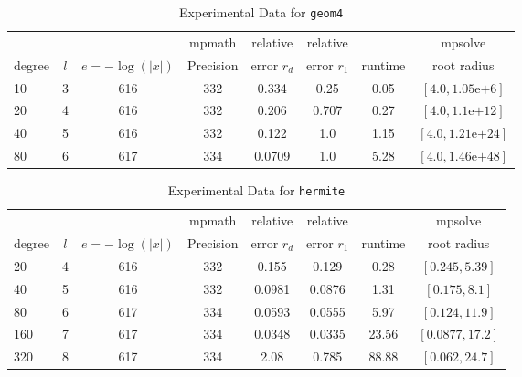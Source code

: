 \documentclass[sigconf]{acmart}
\begin{document}
\begin{table}[t]
\caption{Experimental Data for \texttt{geom4}} %
\label{tab:geom4}
\vskip -0.15in
\begin{center}
\begin{small}
\begin{sc}
\begin{tabular}{lccccccc}
\toprule
&  &  & mpmath & relative  & relative &  & mpsolve \\
degree  & $l$& $e=-\log(|x|)$& Precision &error $r_d$       & error $r_1$ &runtime& root radius\\
\midrule
 10 & 3 & 616 & 332 & 0.334 & 0.25 & 0.05 & $[4.0, 1.05\text{e+}6]$\\
 20 & 4 & 616 & 332 & 0.206 & 0.707 & 0.27 & $[4.0, 1.1\text{e+}12]$\\
 40 & 5 & 616 & 332 & 0.122 & 1.0 & 1.15 & $[4.0, 1.21\text{e+}24]$\\
 80 & 6 & 617 & 334 & 0.0709 & 1.0 & 5.28 & $[4.0, 1.46\text{e+}48]$\\
\bottomrule
\end{tabular}
\end{sc}
\end{small}
\end{center}
\vskip 0.05in
\end{table}

\begin{table}[t]
\caption{Experimental Data for \texttt{hermite}} %
\label{tab:hermite}
\vskip -0.15in
\begin{center}
\begin{small}
\begin{sc}
\begin{tabular}{lccccccc}
\toprule
&  &  & mpmath & relative  & relative &  & mpsolve \\
degree  & $l$& $e=-\log(|x|)$& Precision &error $r_d$       & error $r_1$ &runtime& root radius\\
\midrule
 20 & 4 & 616 & 332 & 0.155 & 0.129 & 0.28 & $[0.245, 5.39]$\\
 40 & 5 & 616 & 332 & 0.0981 & 0.0876 & 1.31 & $[0.175, 8.1]$\\
 80 & 6 & 617 & 334 & 0.0593 & 0.0555 & 5.97 & $[0.124, 11.9]$\\
 160 & 7 & 617 & 334 & 0.0348 & 0.0335 & 23.56 & $[0.0877, 17.2]$\\
 320 & 8 & 617 & 334 & 2.08 & 0.785 & 88.88 & $[0.062, 24.7]$\\
\bottomrule
\end{tabular}
\end{sc}
\end{small}
\end{center}
\vskip 0.05in
\end{table}
\end{document}

